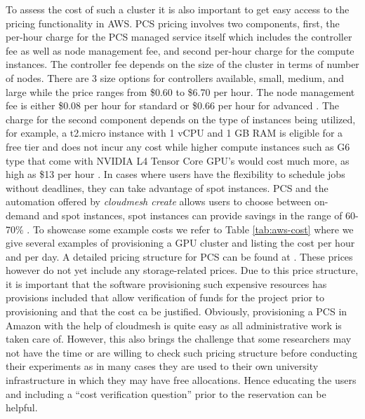 \documentclass[utf8]{FrontiersinVancouver} %
\begin{document}
To assess the cost of such a cluster it is also important to get easy access to the pricing functionality in AWS.
PCS pricing involves two components, first, the per-hour charge for the PCS managed service itself which includes the controller fee as well as node management fee, and second per-hour charge for the compute instances. The controller fee depends on the size of the cluster in terms of number of nodes. There are 3 size options for controllers available, small, medium, and large while the price ranges from \$0.60 to \$6.70 per hour. The node management fee is either \$0.08 per hour for standard or \$0.66 per hour for advanced \citep{HPCpricing:online}. The charge for the second component depends on the type of instances being utilized, for example, a t2.micro instance with 1 vCPU and 1 GB RAM is eligible for a free tier and does not incur any cost while higher compute instances such as G6 type that come with NVIDIA L4 Tensor Core GPU's would cost much more, as high as \$13 per hour \citep{ec2ondemand:online}. In cases where users have the flexibility to schedule jobs without deadlines, they can take advantage of spot instances. PCS and the automation offered by {\em cloudmesh create} allows users to choose between on-demand and spot instances, spot instances can provide savings in the range of 60-70\% \citep{spotSavings:online}.
To showcase some example costs we refer to Table \ref{tab:aws-cost} where we give several examples of provisioning a GPU cluster and listing the cost per hour and per day. A detailed pricing structure for PCS can be found at \citep{www-aws-pricing}. 
These prices however do not yet include any storage-related prices. Due to this price structure, it is important that the software provisioning such expensive resources has provisions included that allow verification of funds for the project prior to provisioning and that the cost ca be justified. Obviously, provisioning a PCS in Amazon with the help of cloudmesh is quite easy as all administrative work is taken care of. However, this also brings the challenge that some researchers may not have the time or are willing to check such pricing structure before conducting their experiments as in many cases they are used to their own university infrastructure in which they may have free allocations. Hence educating the users and including a ``cost verification question'' prior to the reservation can be helpful.
\end{document}
